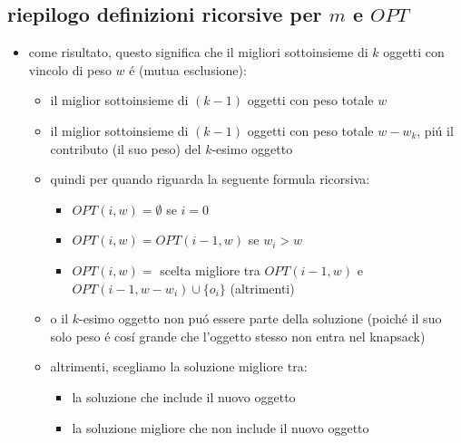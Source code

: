 \subsection*{riepilogo definizioni ricorsive per $m$ e $OPT$}
\begin{flushleft}
	\begin{itemize}
		\item come risultato, questo significa che il migliori sottoinsieme di $k$ oggetti con vincolo di peso $w$ \'e (mutua esclusione):
		\begin{itemize}
			\item il miglior sottoinsieme di $(k-1)$ oggetti con peso totale $w$
			\item il miglior sottoinsieme di $(k-1)$ oggetti con peso totale $w-w_k$, pi\'u il contributo (il suo peso) del $k$-esimo oggetto
			\item quindi per quando riguarda la seguente formula ricorsiva:
			\begin{itemize}
				\item $OPT(i,w)=\emptyset$ se $i=0$
				\item $OPT(i,w)=OPT(i-1,w)$ se $w_i>w$
				\item $OPT(i,w)=$ scelta migliore tra $OPT(i-1,w)$ e $OPT(i-1,w-w_i)\cup\{o_i\}$ (altrimenti)
			\end{itemize}
		\item o il $k$-esimo oggetto non pu\'o essere parte della soluzione (poich\'e il suo solo peso \'e cos\'i grande che l'oggetto stesso non entra nel knapsack)
		\item altrimenti, scegliamo la soluzione migliore tra:
		\begin{itemize}
			\item la soluzione che include il nuovo oggetto
			\item la soluzione migliore che non include il nuovo oggetto
		\end{itemize}
		\end{itemize}
	\end{itemize}
\end{flushleft}


